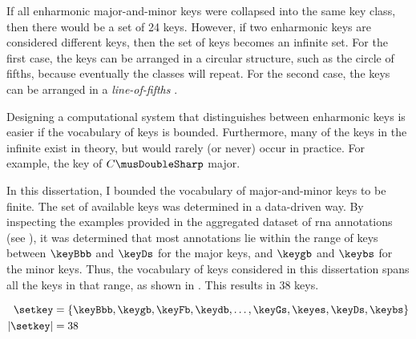 
If all enharmonic major-and-minor keys were collapsed into
the same key class, then there would be a set of 24 keys.
However, if two enharmonic keys are considered different
keys, then the set of keys becomes an infinite set. For the
first case, the keys can be arranged in a circular
structure, such as the circle of fifths, because eventually
the classes will repeat. For the second case, the keys can
be arranged in a \emph{line-of-fifths}
\parencite{temperley2000line}.


Designing a computational system that distinguishes between
enharmonic keys is easier if the vocabulary of keys is
bounded. Furthermore, many of the keys in the infinite exist
in theory, but would rarely (or never) occur in practice.
For example, the key of $C\musDoubleSharp$ major.

In this dissertation, I bounded the vocabulary of
major-and-minor keys to be finite. The set of available keys
was determined in a data-driven way. By inspecting the
examples provided in the aggregated dataset of \gls{rna}
annotations (see ),
it was determined that most annotations lie within the range
of keys between $\keyBbb$ and $\keyDs$ for the major keys,
and $\keygb$ and $\keybs$ for the minor keys. Thus, the
vocabulary of keys considered in this dissertation spans all
the keys in that range, as shown in . This
results in 38 keys.

\begin{equation}
    \label{eq:keys}
    \begin{split}
    \setkey &= \{ \keyBbb, \keygb, \keyFb, \keydb, \dotsc,
    \keyGs, \keyes, \keyDs, \keybs \}\\
    | \setkey | &= 38
    \end{split}
\end{equation}

